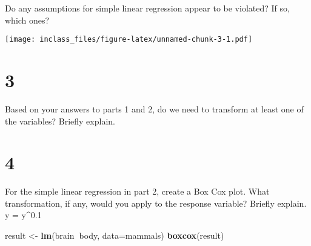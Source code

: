 \documentclass[]{article}
\newenvironment{Shaded}{\begin{snugshade}}{\end{snugshade}}
\newcommand{\KeywordTok}[1]{\textcolor[rgb]{0.13,0.29,0.53}{\textbf{#1}}}
\newcommand{\DataTypeTok}[1]{\textcolor[rgb]{0.13,0.29,0.53}{#1}}
\newcommand{\DecValTok}[1]{\textcolor[rgb]{0.00,0.00,0.81}{#1}}
\newcommand{\StringTok}[1]{\textcolor[rgb]{0.31,0.60,0.02}{#1}}
\newcommand{\OperatorTok}[1]{\textcolor[rgb]{0.81,0.36,0.00}{\textbf{#1}}}
\newcommand{\NormalTok}[1]{#1}
\begin{document}
Do any assumptions for simple linear regression appear to be violated?
If so, which ones?

\begin{Shaded}
\end{Shaded}

\texttt{[image: inclass\_files/figure-latex/unnamed-chunk-3-1.pdf]}

\section{3}\label{section-1}

Based on your answers to parts 1 and 2, do we need to transform at least
one of the variables? Briefly explain.

\section{4}\label{section-2}

For the simple linear regression in part 2, create a Box Cox plot. What
transformation, if any, would you apply to the response variable?
Briefly explain. y = y\^{}0.1

\begin{Shaded}
\begin{Highlighting}[]
\NormalTok{result <-}\StringTok{ }\KeywordTok{lm}\NormalTok{(brain}\OperatorTok{~}\NormalTok{body, }\DataTypeTok{data=}\NormalTok{mammals)}
\KeywordTok{boxcox}\NormalTok{(result)}
\end{Highlighting}
\end{Shaded}
\end{document}
